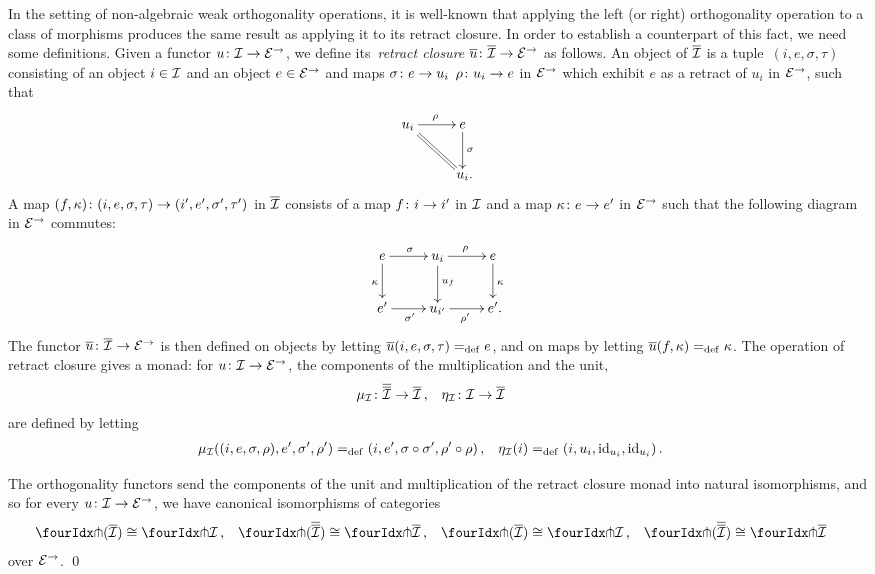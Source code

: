 \documentclass[reqno,10pt,a4paper,oneside,draft]{amsart}
\begin{document}
In the setting of non-algebraic weak orthogonality operations, it is well-known that applying the left (or right) orthogonality operation to a class of morphisms produces the same result as applying it to its retract closure.
In order to establish a counterpart of this fact, we need some definitions.
Given a functor $u \co \cal{I} \to \calE^\to$, we define its~\emph{retract closure} $\overline{u} \co \overline{\cal{I}} \to \catE^\to$ as follows.
An object of $\overline{\cal{I}}$ is a tuple~$(i, e, \sigma, \tau)$ consisting of an object $i \in \cal{I}$ and an object $e \in \catE^\to$ and maps $\sigma \co e \rightarrow u_i$ $\rho \co u_i \rightarrow e$ in $\catE^\to$ which exhibit $e$ as a retract of $u_i$ in $\catE^\to$, \ie such that
\[
\xymatrix{
  u_i \ar[r]^\rho \ar@{=}[dr] & e \ar[d]^{\sigma} \\
  & u_i
\rlap{.}}
\]
A map $(f, \kappa) \co (i, e, \sigma, \tau) \to (i', e', \sigma', \tau')$ in $\overline{\cal{I}}$ consists of a map $f \co i \to i'$ in $\cal{I}$ and a map $\kappa \co e \rightarrow e'$ in $\catE^\to$ such that the following diagram in $\catE^\to$ commutes:
\[
\xymatrix{
  e
  \ar[r]^{\sigma}
  \ar[d]_{\kappa}
&
  u_i
  \ar[r]^{\rho}
  \ar[d]^{u_f}
&
  e
  \ar[d]^{\kappa}
\\
  e'
  \ar[r]_{\sigma'}
&
  u_{i'}
  \ar[r]_{\rho'}
&
  e'
\rlap{.}}
\]
The functor $\overline{u} \co \overline{\cal{I}} \to \catE^\to$ is then defined on objects by letting $\overline{u}(i, e, \sigma, \tau) \defeq e$, and on maps by letting $\overline{u}(f, \kappa) \defeq \kappa$.
The operation of retract closure gives a monad: for $u \co \cal{I} \to \catE^\to$, the components of the multiplication and the unit,
\[
\begin{aligned}
  \mu_\cal{I} &\co \overline{\overline{\cal{I}}} \to \overline{\cal{I}}
\, , &
  \eta_\cal{I} &\co \cal{I} \to \overline{\cal{I}}
\end{aligned}
\]
are defined by letting
\[
\begin{aligned}
  \mu_\cal{I}((i, e, \sigma, \rho), e', \sigma', \rho') &\defeq (i, e', \sigma \cc \sigma', \rho' \cc \rho)
\, , &
  \eta_\cal{I}(i) &\defeq (i, u_i, \id_{u_i}, \id_{u_i})
\, .
\end{aligned}
\]

\begin{proposition} \label{retract-closure}
The orthogonality functors send the components of the unit and multiplication of the retract closure monad into natural isomorphisms, and so for every $u \co \cal{I} \to \catE^\to$, we have canonical isomorphisms of categories
\[
\begin{aligned}
  \liftr{(\overline{\cal{I}})} &\iso \liftr{\cal{I}}
\, ,&
  \liftr{(\overline{\overline{\cal{I}}})} &\iso \liftr{\overline{\cal{I}}}
\, ,&
  \liftl{(\overline{\cal{I}})} &\iso \liftl{\cal{I}}
\, ,&
 \liftl{(\overline{\overline{\cal{I}}})} &\iso \liftl{\overline{\cal{I}}}
\end{aligned}
\]
over $\catE^\to$.
\qed
\end{proposition}
\end{document}

